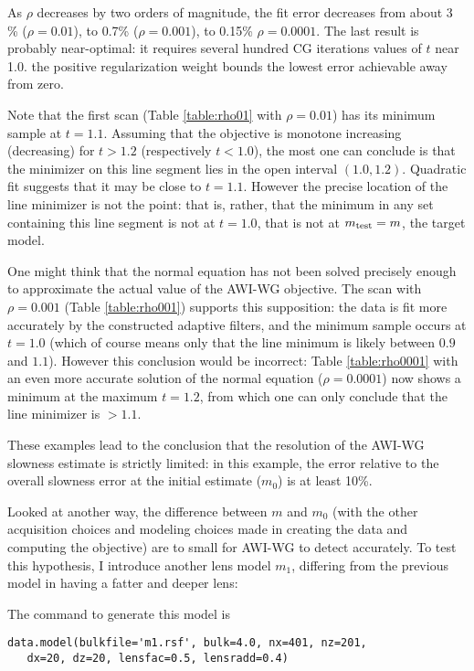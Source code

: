 As $\rho$ decreases by two orders of magnitude, the fit error decreases from about 3 \% ($\rho=0.01$), to 0.7\% ($\rho=0.001$), to 0.15\% $\rho=0.0001$. The last result is probably near-optimal: it requires several hundred CG iterations values of $t$ near 1.0. the positive regularization weight bounds the lowest error achievable away from zero.

Note that the first scan (Table \ref{table:rho01} with $\rho=0.01$) has its minimum sample at $t=1.1$. Assuming that the objective is monotone increasing (decreasing) for $t > 1.2$ (respectively $t < 1.0$), the most one can conclude is that the minimizer on this line segment lies in the open interval $(1.0, 1.2)$. Quadratic fit suggests that it may be close to $t=1.1$. However the precise location of the line minimizer is not the point: that is, rather, that the minimum in any set containing this line segment is not at $t=1.0$, that is not at $m_{\rm test} = m$, the target model.

One might think that the normal equation has not been solved precisely enough to approximate the actual value of the AWI-WG objective. The scan with $\rho=0.001$ (Table \ref{table:rho001}) supports this supposition: the data is fit more accurately by the constructed adaptive filters, and the minimum sample occurs at $t=1.0$ (which of course means only that the line minimum is likely between $0.9$ and $1.1$). However this conclusion would be incorrect: Table \ref{table:rho0001} with an even more accurate solution of the normal equation ($\rho=0.0001$) now shows a minimum at the maximum $t = 1.2$, from which one can only conclude that the line minimizer is $> 1.1$.

These examples lead to the conclusion that the resolution of the AWI-WG slowness estimate is strictly limited: in this example, the error relative to the overall slowness error at the initial estimate ($m_0$) is at least 10\%.

Looked at another way, the difference between $m$ and $m_0$ (with the other acquisition choices and modeling choices made in creating the data and computing the objective) are to small for AWI-WG to detect accurately. To test this hypothesis, I introduce another lens model $m_1$, differing from the previous model in having a fatter and deeper lens:


The command to generate this model is
\begin{verbatim}
data.model(bulkfile='m1.rsf', bulk=4.0, nx=401, nz=201,
   dx=20, dz=20, lensfac=0.5, lensradd=0.4)
\end{verbatim}

